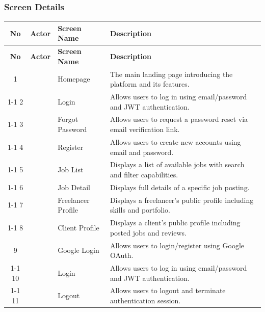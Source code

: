 \subsubsection{Screen Details}
\renewcommand{\arraystretch}{1.3}
\begin{longtable}{|c|>{\centering\arraybackslash}m{2.5cm}|p{3.5cm}|p{6cm}|}
\hline
\rowcolor{headerbg}
\textbf{No} &
\textbf{Actor} &
\textbf{Screen Name} &
\textbf{Description} \\
\hline
\endfirsthead
\hline
\rowcolor{headerbg}
\textbf{No} &
\textbf{Actor} &
\textbf{Screen Name} &
\textbf{Description} \\
\hline
\endhead
\hline
\endfoot
\hline
\endlastfoot
1 &
\multirow{8}{2.5cm}{\centering Guest} &
Homepage &
The main landing page introducing the platform and its features.
\\ \cline{1-1}\cline{3-4}
2 &
&
Login &
Allows users to log in using email/password and JWT authentication.
\\ \cline{1-1}\cline{3-4}
3 &
&
Forgot Password &
Allows users to request a password reset via email verification link.
\\ \cline{1-1}\cline{3-4}
4 &
&
Register &
Allows users to create new accounts using email and password.
\\ \cline{1-1}\cline{3-4}
5 &
&
Job List &
Displays a list of available jobs with search and filter capabilities.
\\ \cline{1-1}\cline{3-4}
6 &
&
Job Detail &
Displays full details of a specific job posting.
\\ \cline{1-1}\cline{3-4}
7 &
&
Freelancer Profile &
Displays a freelancer's public profile including skills and portfolio.
\\ \cline{1-1}\cline{3-4}
8 &
&
Client Profile &
Displays a client's public profile including posted jobs and reviews.
\\ \hline
9 &
\multirow{28}{2.5cm}{\centering Freelancer} &
Google Login &
Allows users to login/register using Google OAuth.
\\ \cline{1-1}\cline{3-4}
10 &
&
Login &
Allows users to log in using email/password and JWT authentication.
\\ \cline{1-1}\cline{3-4}
11 &
&
Logout &
Allows users to logout and terminate authentication session.

\end{longtable}
